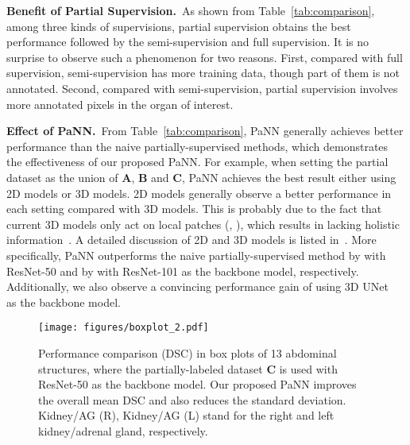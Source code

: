 \documentclass[10pt,twocolumn,letterpaper]{article}
\begin{document}
\vspace{1ex}\noindent\textbf{Benefit of Partial Supervision.}~As shown from Table~\ref{tab:comparison}, among three kinds of supervisions, partial supervision obtains the best performance followed by the semi-supervision and full supervision. It is no surprise to observe such a phenomenon for two reasons. First, compared with full supervision, semi-supervision has more training data, though part of them is not annotated. Second, compared with semi-supervision, partial supervision involves more annotated pixels in the organ of interest. 

\vspace{1ex}\noindent\textbf{Effect of PaNN.}~From Table~\ref{tab:comparison}, PaNN generally achieves better performance than the naive partially-supervised methods, which demonstrates the effectiveness of our proposed PaNN. For example, when setting the partial dataset as the union of \textbf{A}, \textbf{B} and \textbf{C}, PaNN achieves the best result either using 2D models or 3D models. 2D models generally observe a better performance in each setting compared with 3D models. This is probably due to the fact that current 3D models only act on local patches (\eg, ), which results in lacking holistic information~\cite{wang2018abdominal}. A detailed discussion of 2D and 3D models is listed in~\cite{lai2015deep}. More specifically, PaNN outperforms the naive partially-supervised method by  with ResNet-50 and by  with ResNet-101 as the backbone model, respectively. Additionally, we also observe a convincing performance gain of  using 3D UNet~\cite{cciccek20163d, ronneberger2015u} as the backbone model. 
              
\begin{figure*}
\centering
\texttt{[image: figures/boxplot\_2.pdf]}
\caption{Performance comparison (DSC) in box plots of 13 abdominal structures, where the partially-labeled dataset \textbf{C} is used with ResNet-50 as the backbone model. Our proposed PaNN improves the overall mean DSC and also reduces the standard deviation. Kidney/AG (R), Kidney/AG (L) stand for the right and left kidney/adrenal gland, respectively.}
\label{fig:boxplot}
\vspace{-1em}
\end{figure*}
\end{document}
